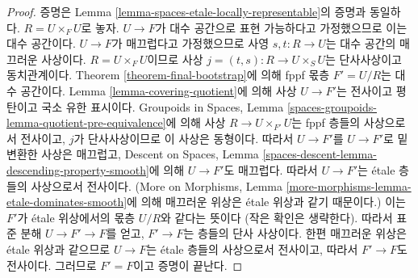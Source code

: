 \begin{proof}
증명은 Lemma
\ref{lemma-spaces-etale-locally-representable}의 증명과 동일하다.
$R = U \times_F U$로 놓자. $U \to F$가 대수 공간으로 표현
가능하다고 가정했으므로 이는 대수 공간이다.
$U \to F$가 매끄럽다고 가정했으므로 사영
$s, t : R \to U$는 대수 공간의 매끄러운 사상이다.
$R = U \times_F U$이므로 사상
$j = (t, s) : R \to U \times_S U$는 단사사상이고 동치관계이다.
Theorem \ref{theorem-final-bootstrap}에 의해 fppf 몫층
$F' = U/R$는 대수 공간이다.
Lemma \ref{lemma-covering-quotient}에 의해 사상 $U \to F'$는
전사이고 평탄이고 국소 유한 표시이다.
Groupoids in Spaces, Lemma
\ref{spaces-groupoids-lemma-quotient-pre-equivalence}에 의해
사상 $R \to U \times_{F'} U$는 fppf 층들의 사상으로서 전사이고,
$j$가 단사사상이므로 이 사상은 동형이다.
따라서 $U \to F'$를 $U \to F'$로 밑변환한 사상은 매끄럽고,
Descent on Spaces, Lemma
\ref{spaces-descent-lemma-descending-property-smooth}에 의해
$U \to F'$도 매끄럽다.
따라서 $U \to F'$는 \'etale 층들의 사상으로서 전사이다.
(More on Morphisms, Lemma
\ref{more-morphisms-lemma-etale-dominates-smooth}에 의해 매끄러운 위상은
\'etale 위상과 같기 때문이다.)
이는 $F'$가 \'etale 위상에서의 몫층 $U/R$와 같다는 뜻이다
(작은 확인은 생략한다). 따라서 표준 분해
$U \to F' \to F$를 얻고, $F' \to F$는 층들의 단사 사상이다.
한편 매끄러운 위상은 \'etale 위상과 같으므로
$U \to F$는 \'etale 층들의 사상으로서 전사이고,
따라서 $F' \to F$도 전사이다. 그러므로 $F' = F$이고
증명이 끝난다.
\end{proof}
















































